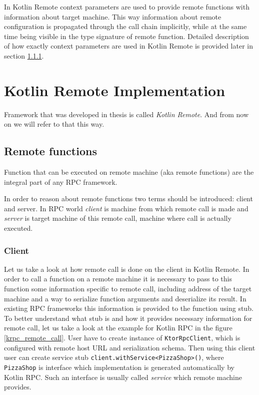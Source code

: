 \documentclass[a4paper,11pt,oneside]{article}
\newcommand{\term}[1]{\textit{#1}}
\newcommand{\kotlini}[1]{\texttt{#1}}
\begin{document}
In Kotlin Remote context parameters are used to provide remote functions with information about
target machine. This way information about remote configuration is propagated through the call
chain implicitly, while at the same time being visible in the type signature of remote function.
Detailed description of how exactly context parameters are used in Kotlin Remote is provided later
in section \ref{client-section}.


\section{Kotlin Remote Implementation}

Framework that was developed in thesis is called \term{Kotlin Remote}. And from now on we will refer 
to that this way. 

\subsection{Remote functions}

Function that can be executed on remote machine (aka remote functions) are the integral part of any 
RPC framework.

In order to reason about remote functions two terms should be introduced: client and server.
In RPC world \term{client} is machine from which remote call is made and \term{server}
is target machine of this remote call, machine where call is actually executed.

\subsubsection{Client} \label{client-section}

Let us take a look at how remote call is done on the client in Kotlin Remote. In order to call
a function on a remote machine it is necessary to pass to this function some information specific
to remote call, including address of the target machine and a way to serialize function arguments
and deserialize its result. In existing RPC frameworks this information is provided to the function
using stub. To better understand what stub is and how it provides necessary information for remote
call, let us take a look at the example for Kotlin RPC in the figure \ref{krpc_remote_call}. User
have to create instance of \kotlini{KtorRpcClient}, which is configured with remote host URL
and serialization schema. Then using this client user can create service stub
\kotlini{client.withService<PizzaShop>()}, where \kotlini{PizzaShop} is interface which
implementation is generated automatically by Kotlin RPC. Such an interface is usually called \term{service}
which remote machine provides.
\end{document}
